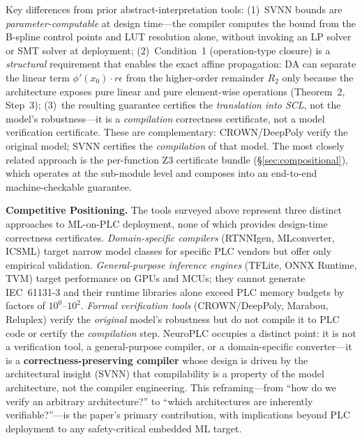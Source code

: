 \documentclass[journal,onecolumn]{IEEEtran}
\newcommand{\neuroplc}{NeuroPLC\xspace}
\begin{document}
Key differences from prior abstract-interpretation tools: (1)~SVNN bounds
are \textit{parameter-computable} at design time---the compiler computes
the bound from the B-spline control points and LUT resolution alone,
without invoking an LP solver or SMT solver at deployment;
(2)~Condition~1 (operation-type closure) is a \textit{structural}
requirement that enables the exact affine propagation: DA can separate
the linear term $\phi'(x_0) \cdot r\epsilon$ from the higher-order
remainder $R_2$ only because the architecture exposes pure linear and
pure element-wise operations (Theorem~2, Step~3); (3)~the resulting
guarantee certifies the \emph{translation into SCL}, not the model's
robustness---it is a \textit{compilation} correctness certificate, not a
model verification certificate. These are complementary: CROWN/DeepPoly
verify the original model; SVNN certifies the \textit{compilation} of
that model. The most closely related approach is the per-function Z3
certificate bundle ({\S}\ref{sec:compositional}), which operates at the
sub-module level and composes into an end-to-end machine-checkable
guarantee.



\vspace{4pt}
\noindent\textbf{Competitive Positioning.}
The tools surveyed above represent three distinct approaches to ML-on-PLC
deployment, none of which provides design-time correctness certificates.
\textit{Domain-specific compilers} (RTNNIgen, MLconverter, ICSML) target
narrow model classes for specific PLC vendors but offer only empirical
validation. \textit{General-purpose inference engines} (TFLite, ONNX Runtime,
TVM) target performance on GPUs and MCUs; they cannot generate IEC~61131-3
and their runtime libraries alone exceed PLC memory budgets by factors of
$10^0$--$10^2$. \textit{Formal verification tools} (CROWN/DeepPoly, Marabou,
Reluplex) verify the \textit{original} model's robustness but do not compile
it to PLC code or certify the \textit{compilation} step. \neuroplc occupies
a distinct point: it is not a verification tool, a general-purpose compiler,
or a domain-specific converter---it is a \textbf{correctness-preserving
compiler} whose design is driven by the architectural insight (SVNN) that
compilability is a property of the model architecture, not the compiler
engineering. This reframing---from ``how do we verify an arbitrary
architecture?'' to ``which architectures are inherently verifiable?''---is the
paper's primary contribution, with implications beyond PLC deployment to any
safety-critical embedded ML target.%

\end{document}
